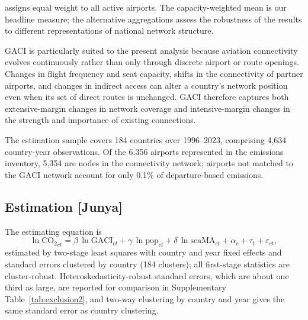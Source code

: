 \documentclass[12pt]{article}
\begin{document}
assigns equal weight to all active airports. The capacity-weighted mean is our headline measure; the alternative aggregations assess the robustness of the results to different representations of national network structure.

GACI is particularly suited to the present analysis because aviation connectivity evolves continuously rather than only through discrete airport or route openings. Changes in flight frequency and seat capacity, shifts in the connectivity of partner airports, and changes in indirect access can alter a country's network position even when its set of direct routes is unchanged. GACI therefore captures both extensive-margin changes in network coverage and intensive-margin changes in the strength and importance of existing connections.

The estimation sample covers 184 countries over 1996--2023, comprising 4,634 country-year observations. Of the 6,356 airports represented in the emissions inventory, 5,354 are nodes in the connectivity network; airports not matched to the GACI network account for only 0.1\% of departure-based emissions.


\subsection*{Estimation [Junya]}
The estimating equation is
\begin{equation}
\ln \mathrm{CO_2}_{ct} = \beta \,\ln \mathrm{GACI}_{ct}
 + \gamma \,\ln \mathrm{pop}_{ct} + \delta \,\ln \mathrm{seaMA}_{ct}
 + \alpha_c + \tau_t + \varepsilon_{ct},
\label{eq:main}
\end{equation}
estimated by two-stage least squares with country and year fixed effects
and standard errors clustered by country (184 clusters); all first-stage
statistics are cluster-robust. Heteroskedasticity-robust standard errors,
which are about one third as large, are reported for comparison in
Supplementary Table~\ref{tab:exclusion2}, and two-way clustering by
country and year gives the same standard error as country clustering.
\end{document}

